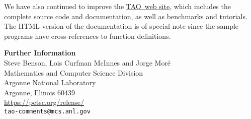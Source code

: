 \documentclass[11pt]{article}
\newcommand{\tao} {\mbox{\sf \footnotesize TAO}}
\begin{document}
We have also continued to improve the 
\href{https://petsc.org/release/}{\tao\ web site}, which
includes the
complete source code and documentation, as well as benchmarks and tutorials.
The HTML version of the documentation is of special note
since the sample programs have cross-references
to function definitions.


\bigskip

\begin{flushleft}
\textbf{Further Information}\\
\medskip
Steve Benson, Lois Curfman McInnes and Jorge Mor\'{e}\\
Mathematics and Computer Science Division\\
Argonne National Laboratory\\
Argonne, Illinois 60439\\
\medskip
\url{https://petsc.org/release/} \\
\texttt{tao-comments@mcs.anl.gov}
\end{flushleft}
\end{document}
